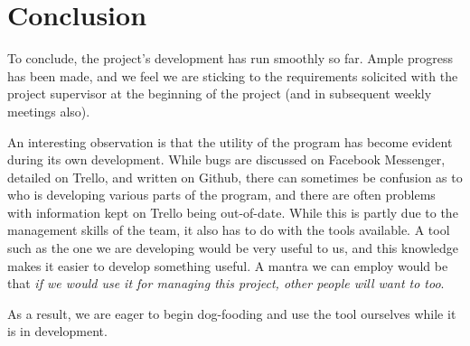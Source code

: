 \documentclass[10pt]{article}
\begin{document}
\section{Conclusion}\par
To conclude, the project's development has run smoothly so far. Ample progress has been made, and we feel we are sticking to the requirements solicited with the project supervisor at the beginning of the project (and in subsequent weekly meetings also). \par
An interesting observation is that the utility of the program has become evident during its own development. While bugs are discussed on Facebook Messenger, detailed on Trello, and written on Github, there can sometimes be confusion as to who is developing various parts of the program, and there are often problems with information kept on Trello being out-of-date. While this is partly due to the management skills of the team, it also has to do with the tools available. A tool such as the one we are developing would be very useful to us, and this knowledge makes it easier to develop something useful. A mantra we can employ would be that \emph{if we would use it for managing this project, other people will want to too}. \par
As a result, we are eager to begin dog-fooding and use the tool ourselves while it is in development.
\end{document}
